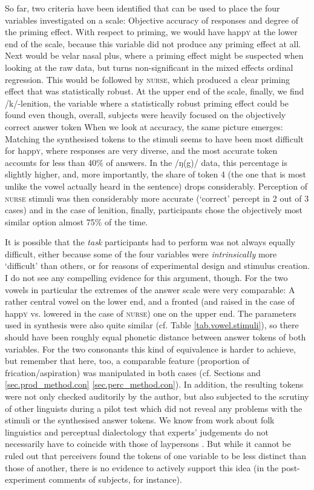 So far, two criteria have been identified that can be used to place the four variables investigated on a scale: Objective accuracy of responses and degree of the priming effect.
With respect to priming, we would have happ\textsc{y} at the lower end of the scale, because this variable did not produce any priming effect at all.
Next would be velar nasal plus, where a priming effect might be suspected when looking at the raw data, but turns non-significant in the mixed effects ordinal regression.
This would be followed by \textsc{nurse}, which produced a clear priming effect that was statistically robust.
At the upper end of the scale, finally, we find /k/-lenition, the variable where a statistically robust priming effect could be found even though, overall, subjects were heavily focused on the objectively correct answer token
When we look at accuracy, the same picture emerges:
Matching the synthesised tokens to the stimuli seems to have been most difficult for happ\textsc{y}, where responses are very diverse, and the most accurate token accounts for less than 40\% of answers.
In the /ŋ(g)/ data, this percentage is slightly higher, and, more importantly, the share of token 4 (the one that is most unlike the vowel actually heard in the sentence) drops considerably.
Perception of \textsc{nurse} stimuli was then considerably more accurate (`correct' percept in 2 out of 3 cases) and in the case of lenition, finally, participants chose the objectively most similar option almost 75\% of the time.

It is possible that the \emph{task} participants had to perform was not always equally difficult, either because some of the four variables were \emph{intrinsically} more `difficult' than others, or for reasons of experimental design and stimulus creation.
I do not see any compelling evidence for this argument, though.
For the two vowels in particular the extremes of the answer scale were very comparable: A rather central vowel on the lower end, and a fronted (and raised in the case of happ\textsc{y} vs. lowered in the case of \textsc{nurse)} one on the upper end.
The parameters used in synthesis were also quite similar (cf. Table \ref{tab.vowel.stimuli}), so there should have been roughly equal phonetic distance between answer tokens of both variables.
For the two consonants this kind of equivalence is harder to achieve, but remember that here, too, a comparable feature (proportion of frication/aspiration) was manipulated in both cases (cf. Sections and \ref{sec.prod_method.con} \ref{sec.perc_method.con}).
In addition, the resulting tokens were not only checked auditorily by the author, but also subjected to the scrutiny of other linguists during a pilot test which did not reveal any problems with the stimuli or the synthesised answer tokens.
We know from work about folk linguistics and perceptual dialectology that experts' judgements do not necessarily have to coincide with those of laypersons \parencite{preston1999,niedzielskipreston2000}.
But while it cannot be ruled out that perceivers found the tokens of one variable to be less distinct than those of another, there is no evidence to actively support this idea (in the post-experiment comments of subjects, for instance). 

